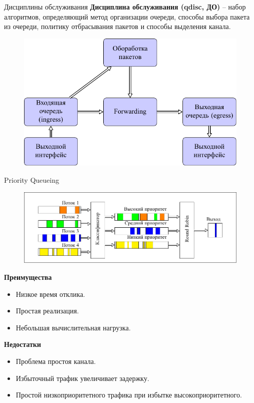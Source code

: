 \documentclass[12pt]{beamer}
\begin{document}
\begin{frame}{Дисциплины обслуживания}
	\textbf{Дисциплина обслуживания (qdisc, ДО)} -- набор алгоритмов,
	определяющий метод организации очереди, способы выбора пакета из очереди,
	политику отбрасывания пакетов и способы выделения канала.
	\begin{figure}
		\center
    	\includegraphics[scale=0.7]{../text/src/pdfimages/qdisc.pdf}
	\end{figure}


\end{frame}

\begin{frame}{Priority Queueing}
	\begin{figure}
		\center
    	\includegraphics[scale=0.6]{../text/src/pdfimages/pq.pdf}
	\end{figure}
	\begin{center}
        {\footnotesize
            \begin{multicols}{2}
				{\bf Преимущества}
				\begin{itemize}
					\item Низкое время отклика.
					\item Простая реализация.
					\item Небольшая вычислительная нагрузка.
				\end{itemize}
            \columnbreak
				{\bf Недостатки}
				\begin{itemize}
					\item Проблема простоя канала.
					\item Избыточный трафик увеличивает задержку.
					\item Простой низкоприоритетного трафика при избытке высокоприоритетного.
				\end{itemize}
            \end{multicols}
        }
	\end{center}
\end{frame}
\end{document}
